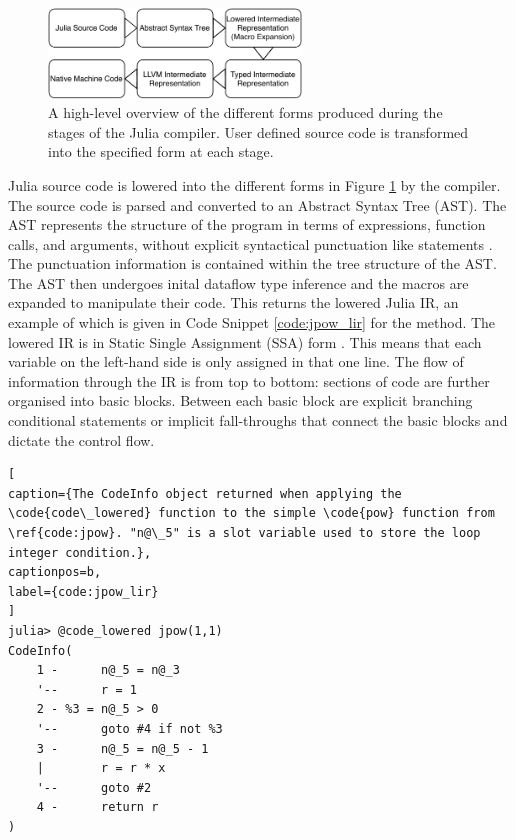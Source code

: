 \begin{figure}[tbh!]
    \centering
    \includegraphics[width=0.6\textwidth]{Images/compiler_stage_simp.pdf}
    \caption{A high-level overview of the different forms produced during the stages of the Julia compiler. User defined source code is transformed into the specified form at each stage.}
    \label{fig:julia_compiler_flow_simp}
\end{figure}

Julia source code is lowered into the different forms in Figure \ref{fig:julia_compiler_flow_simp} by the compiler. The source code is parsed and converted to an Abstract Syntax Tree (AST). The AST represents the structure of the program in terms of expressions, function calls, and arguments, without explicit syntactical punctuation like  statements \cite{ASTImpl2003}. The punctuation information is contained within the tree structure of the AST. The AST then undergoes inital dataflow type inference and the macros are expanded to manipulate their code. This returns the lowered Julia IR, an example of which is given in Code Snippet \ref{code:jpow_lir} for the  method. The lowered IR is in Static Single Assignment (SSA) form \cite{eng_compiler}. This means that each variable on the left-hand side is only assigned in that one line. The flow of information through the IR is from top to bottom: sections of code are further organised into basic blocks. Between each basic block are explicit branching conditional statements or implicit fall-throughs that connect the basic blocks and dictate the control flow. 

\begin{lstlisting}[
caption={The CodeInfo object returned when applying the \code{code\_lowered} function to the simple \code{pow} function from \ref{code:jpow}. "n@\_5" is a slot variable used to store the loop integer condition.},
captionpos=b, 
label={code:jpow_lir}
]
julia> @code_lowered jpow(1,1)
CodeInfo(
    1 -      n@_5 = n@_3
    '--      r = 1
    2 - %3 = n@_5 > 0
    '--      goto #4 if not %3
    3 -      n@_5 = n@_5 - 1
    |        r = r * x
    '--      goto #2
    4 -      return r
)
\end{lstlisting}

